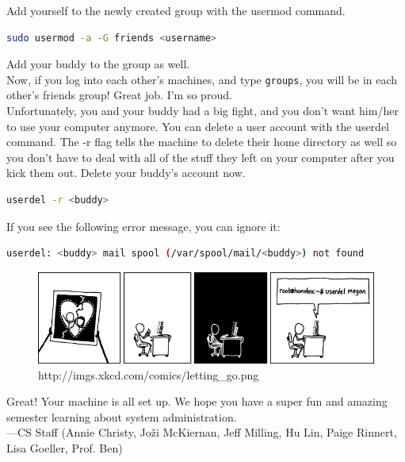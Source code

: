 \documentclass{article}
\begin{document}
Add yourself to the newly created group with the usermod command.

\begin{lstlisting}[language = bash]
sudo usermod -a -G friends <username>
\end{lstlisting}

Add your buddy to the group as well. \\

Now, if you log into each other's machines, and type \texttt{groups}, you will be in each
other's friends group! Great job. I'm so proud.\\

Unfortunately, you and your buddy had a big fight, and you don't want him/her to
use your computer anymore. You can delete a user account with the userdel
command. The -r flag tells the machine to delete their home directory as well so
you don't have to deal with all of the stuff they left on your computer after
you kick them out. Delete your buddy's account now.

\begin{lstlisting}[language = bash]
userdel -r <buddy>
\end{lstlisting}
If you see the following error message, you can ignore it: 

\begin{lstlisting}[language = bash,backgroundcolor=\color{white}]
userdel: <buddy> mail spool (/var/spool/mail/<buddy>) not found
\end{lstlisting}

\begin{figure}[H]
\centering
\includegraphics[width=.9\textwidth]{letting_go.png}
\caption{http://imgs.xkcd.com/comics/letting\_go.png}

\label{fig:letitgo}
\end{figure}


Great! Your machine is all set up. We hope you have a super fun and amazing
semester learning about system administration.\\

---CS Staff (Annie Christy, Jo\v{z}i McKiernan, Jeff Milling, Hu Lin, Paige Rinnert, Lisa
Goeller, Prof. Ben)
\end{document}
